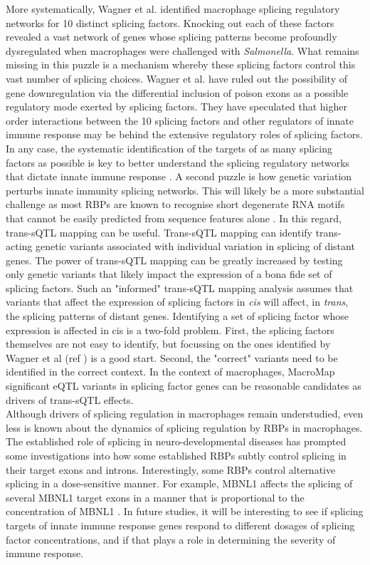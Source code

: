 More systematically, Wagner et al. \cite{Wagner2021-fl} identified macrophage splicing regulatory networks for 10 distinct splicing factors. Knocking out each of these factors revealed a vast network of genes whose splicing patterns become profoundly dysregulated when macrophages were challenged with \textit{Salmonella}. What remains missing in this puzzle is a mechanism whereby these splicing factors control this vast number of splicing choices. Wagner et al. have ruled out the possibility of gene downregulation via the differential inclusion of poison exons as a possible regulatory mode exerted by splicing factors. They have speculated that higher order interactions between the 10 splicing factors and other regulators of innate immune response may be behind the extensive regulatory roles of splicing factors. In any case, the systematic identification of the targets of as many splicing factors as possible is key to better understand the splicing regulatory networks that dictate innate immune response \cite{Wagner2016-kl}. A second puzzle is how genetic variation perturbs innate immunity splicing networks. This will likely be a more substantial challenge as most RBPs are known to recognise short degenerate RNA motifs that cannot be easily predicted from sequence features alone \cite{Cereda2014-ty}. In this regard, trans-sQTL mapping can be useful. Trans-sQTL mapping can identify trans-acting genetic variants associated with individual variation in splicing of distant genes. The power of trans-sQTL mapping can be greatly increased by testing only genetic variants that likely impact the expression of a bona fide set of splicing factors. Such an "informed" trans-sQTL mapping analysis assumes that variants that affect the expression of splicing factors in \textit{cis} will affect, in \textit{trans}, the splicing patterns of distant genes. Identifying a set of splicing factor whose expression is affected in cis is a two-fold problem. First, the splicing factors themselves are not easy to identify, but focussing on the ones identified by Wagner et al (ref \cite{Wagner2016-kl}) is a good start. Second, the "correct" variants need to be identified in the correct context. In the context of macrophages, MacroMap significant eQTL variants in splicing factor genes can be reasonable candidates as drivers of trans-sQTL effects. \\ 

Although drivers of splicing regulation in macrophages remain understudied, even less is known about the dynamics of splicing regulation by RBPs in macrophages. The established role of splicing in neuro-developmental diseases has prompted some investigations into how some established RBPs subtly control splicing in their target exons and introns. Interestingly, some RBPs control alternative splicing in a dose-sensitive manner. For example, MBNL1 affects the splicing of several MBNL1 target exons in a manner that is proportional to the concentration of MBNL1 \cite{Wagner2016-kl}. In future studies, it will be interesting to see if splicing targets of innate immune response genes respond to different dosages of splicing factor concentrations, and if that plays a role in determining the severity of immune response. \\

